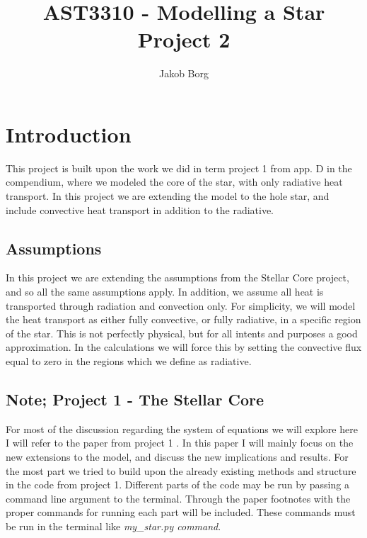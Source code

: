 \documentclass[11pt,a4paper,twocolumn,titlepage]{article}
\title{AST3310 - Modelling a Star\\ 
\vspace{15mm}Project 2}
\author{Jakob Borg}
\begin{document}
\maketitle

\section{Introduction}\label{sec:Intro}
This project is built upon the work we did in term project 1 from app. D in the compendium, where we modeled the core of the star, with only radiative heat transport. In this project we are extending the model to the hole star, and include convective heat transport in addition to the radiative.

\subsection{Assumptions}\label{subsec:Intro/Assumptions}
In this project we are extending the assumptions from the Stellar Core project, and so all the same assumptions apply. In addition, we assume all heat is transported through radiation and convection only. For simplicity, we will model the heat transport as either fully convective, or fully radiative, in a specific region of the star. This is not perfectly physical, but for all intents and purposes a good approximation. In the calculations we will force this by setting the convective flux equal to zero in the regions which we define as radiative.

\subsection{Note; Project 1 - The Stellar Core} \label{subsec:Intro/project1}
For most of the discussion regarding the system of equations we will explore here I will refer to the paper from project 1 \citep{Project1}. In this paper I will mainly focus on the new extensions to the model, and discuss the new implications and results. For the most part we tried to build upon the already existing methods and structure in the code from project 1. Different parts of the code may be run by passing a command line argument to the terminal. Through the paper footnotes with the proper commands for running each part will be included. These commands must be run in the terminal like \textit{my\_star.py command}.
\end{document}
